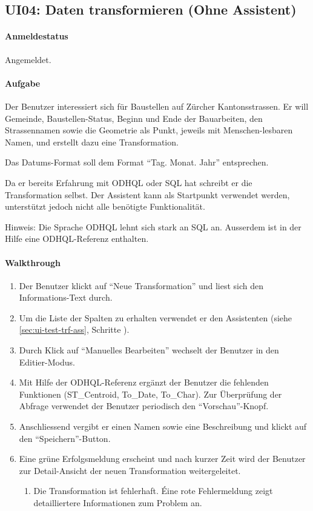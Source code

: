 \subsection{UI04: Daten transformieren (Ohne Assistent)}
\paragraph{Anmeldestatus} Angemeldet.

\paragraph{Aufgabe} Der Benutzer interessiert sich für Baustellen auf Zürcher Kantonsstrassen. Er will Gemeinde, Baustellen-Status, Beginn und Ende der Bauarbeiten, den Strassennamen sowie die Geometrie als Punkt, jeweils mit Menschen-lesbaren Namen, und erstellt dazu eine Transformation.

Das Datums-Format soll dem Format ``Tag. Monat. Jahr'' entsprechen.

Da er bereits Erfahrung mit ODHQL oder SQL hat schreibt er die Transformation selbst. Der Assistent kann als Startpunkt verwendet werden, unterstützt jedoch nicht alle benötigte Funktionalität.

Hinweis: Die Sprache ODHQL lehnt sich stark an SQL an. Ausserdem ist in der Hilfe eine ODHQL-Referenz enthalten.

\paragraph{Walkthrough}
\begin{enumerate}
\item Der Benutzer klickt auf ``Neue Transformation'' und liest sich den Informations-Text durch.
\item Um die Liste der Spalten zu erhalten verwendet er den Assistenten (siehe \cref{sec:ui-test-trf-ass}, Schritte ).
\item Durch Klick auf ``Manuelles Bearbeiten'' wechselt der Benutzer in den Editier-Modus.
\item Mit Hilfe der ODHQL-Referenz ergänzt der Benutzer die fehlenden Funktionen (ST\_Centroid, To\_Date, To\_Char). Zur Überprüfung der Abfrage verwendet der Benutzer periodisch den ``Vorschau''-Knopf.
\item Anschliessend vergibt er einen Namen sowie eine Beschreibung und klickt auf den ``Speichern''-Button.
\item Eine grüne Erfolgsmeldung erscheint und nach kurzer Zeit wird der Benutzer zur Detail-Ansicht der neuen Transformation weitergeleitet.
  \begin{enumerate}[label=\labelenumi\alph*.]
  \item Die Transformation ist fehlerhaft. Éine rote Fehlermeldung zeigt detailliertere Informationen zum Problem an.
  \end{enumerate}
\end{enumerate}

